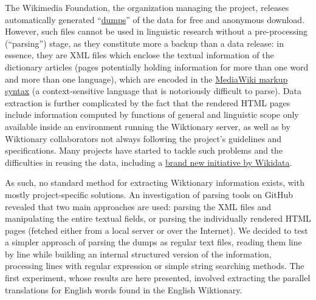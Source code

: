 \documentclass[
  a4paper,
  14pt,
  oneside,
  tablecaptionabove
]{scrbook}
\begin{document}
The Wikimedia Foundation, the organization managing the project,
releases automatically generated
``\href{https://dumps.wikimedia.org/}{dumps}'' of the data for free and
anonymous download. However, such files cannot be used in linguistic
research without a pre-processing (\enquote{parsing}) stage, as they
constitute more a backup than a data release: in essence, they are XML
files which enclose the textual information of the dictionary articles
(pages potentially holding information for more than one word and more
than one language), which are encoded in the
\href{https://www.mediawiki.org/wiki/Markup_spec}{MediaWiki markup
syntax} (a context-sensitive language that is notoriously difficult to
parse). Data extraction is further complicated by the fact that the
rendered HTML pages include information computed by functions of general
and linguistic scope only available inside an environment running the
Wiktionary server, as well as by Wiktionary collaborators not always
following the project's guidelines and specifications. Many projects
have started to tackle such problems and the difficulties in reusing the
data, including a
\href{https://www.wikidata.org/wiki/Wikidata:Lexicographical_data}{brand
new initiative by Wikidata}.

As such, no standard method for extracting Wiktionary information
exists, with mostly project-specific solutions. An investigation of
parsing tools on GitHub revealed that two main approaches are used:
parsing the XML files and manipulating the entire textual fields, or
parsing the individually rendered HTML pages (fetched either from a
local server or over the Internet). We decided to test a simpler
approach of parsing the dumps as regular text files, reading them line
by line while building an internal structured version of the
information, processing lines with regular expression or simple string
searching methods. The first experiment, whose results are here
presented, involved extracting the parallel translations for English
words found in the English Wiktionary.
\end{document}
